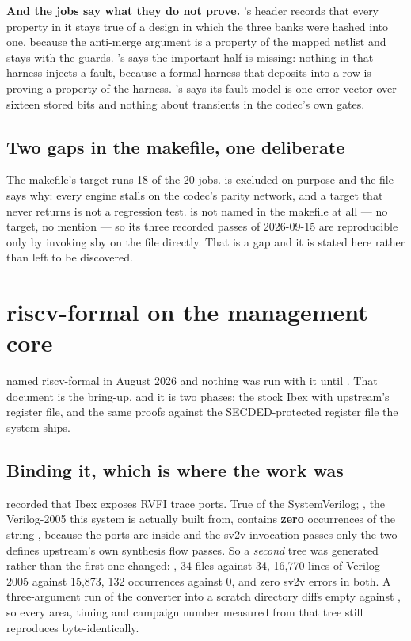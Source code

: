 \textbf{And the jobs say what they do not prove.}
's header records that every property in it stays
true of a design in which the three banks were hashed into one, because
the anti-merge argument is a property of the mapped netlist and stays
with the guards. 's says the important half is
missing: nothing in that harness injects a fault, because a formal
harness that deposits into a row is proving a property of the harness.
's says its fault model is one error vector over
sixteen stored bits and nothing about transients in the codec's own
gates.

\subsection{Two gaps in the makefile, one deliberate}

The makefile's  target runs 18 of the 20 jobs.
 is excluded on purpose and the file says why: every
engine stalls on the codec's parity network, and a target that never
returns is not a regression test.  is not
named in the makefile at all --- no target, no mention --- so its three
recorded passes of 2026-09-15 are reproducible only by invoking sby on
the file directly. That is a gap and it is stated here rather than left
to be discovered.

\section{riscv-formal on the management core}
\label{sec:verif-rvf}

 named riscv-formal in August 2026 and nothing
was run with it until . That document is the bring-up, and it
is two phases: the stock Ibex with upstream's register file, and the same
proofs against the SECDED-protected register file the system ships.

\subsection{Binding it, which is where the work was}

 recorded that Ibex exposes RVFI trace ports. True of the
SystemVerilog; , the Verilog-2005 this
system is actually built from, contains \textbf{zero} occurrences of the
string , because the ports are inside  and
the sv2v invocation passes only the two defines upstream's own synthesis
flow passes. So a \emph{second} tree was generated rather than the first
one changed: , 34 files against 34, 16,770 lines of
Verilog-2005 against 15,873, 132  occurrences against 0, and
zero sv2v errors in both. A three-argument run of the converter into a
scratch directory diffs empty against , so every area,
timing and campaign number measured from that tree still reproduces
byte-identically.

